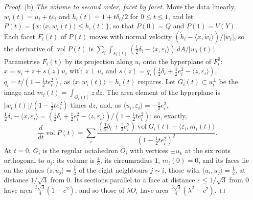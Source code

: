 \documentclass[11pt,reqno]{amsart}
\renewcommand{\_}{\origunderscore\allowbreak}
\numberwithin{equation}{section}
\theoremstyle{plain}
\theoremstyle{definition}
\theoremstyle{remark}
\DeclareMathOperator{\vol}{vol}
\begin{document}
\begin{proof}
(b) \emph{The volume to second order, facet by facet.} Move the data
linearly, $w_i(t)=u_i+t\varepsilon_i$ and $h_i(t)=1+t\delta_i/2$ for
$0\le t\le1$, and let $P(t)=\{x:\langle x,w_i(t)\rangle\le h_i(t)\}$, so that
$P(0)=Q$ and $P(1)=V(Y)$. Each facet $F_i(t)$ of $P(t)$ moves with normal
velocity $(\dot h_i-\langle x,\dot w_i\rangle)/|w_i|$, so the derivative of
$\vol P(t)$ is $\sum_i\int_{F_i(t)}(\frac12\delta_i-\langle x,\varepsilon_i\rangle)\,dA/|w_i(t)|$.
Parametrise $F_i(t)$ by its projection along $u_i$ onto the hyperplane of
$F_i^0$: $x=u_i+z+s(z)u_i$ with $z\perp u_i$ and
$s(z)=q_i(\frac12\delta_i+\frac12e_i^2-\langle z,\varepsilon_i\rangle)$,
$q_i=t/(1-\frac12te_i^2)$, as $\langle x,w_i(t)\rangle=h_i(t)$
requires. Let $G_i(t)\subset u_i^\perp$ be the image and
$m_i(t)=\int_{G_i(t)}z\,dz$. The area element of the hyperplane is
$|w_i(t)|/(1-\frac12te_i^2)$ times $dz$, and, as
$\langle u_i,\varepsilon_i\rangle=-\frac12e_i^2$,
$\frac12\delta_i-\langle x,\varepsilon_i\rangle=(\frac12\delta_i+\frac12e_i^2-\langle z,\varepsilon_i\rangle)/(1-\frac12te_i^2)$;
so, exactly,
\begin{equation}\label{eq:facet-derivative}
  \frac{d}{dt}\vol P(t)=\sum_i\frac{(\frac12\delta_i+\frac12e_i^2)\vol G_i(t)-\langle\varepsilon_i,m_i(t)\rangle}{(1-\frac12te_i^2)^2} .
\end{equation}
At $t=0$, $G_i$ is the regular octahedron $O_i$ with vertices $\pm u_k$ at
the six roots orthogonal to $u_i$: its volume is $\frac43$, its circumradius
$1$, $m_i(0)=0$, and its faces lie on the planes $\langle z,u_j\rangle=\frac12$
of the eight neighbours $j\sim i$, those with $\langle u_i,u_j\rangle=\frac12$,
at distance $1/\sqrt3$ from $0$. Its sections parallel to a face at distance
$c\le1/\sqrt3$ from $0$ have area $\frac{3\sqrt3}4(1-c^2)$, and so those of
$\lambda O_i$ have area $\frac{3\sqrt3}4(\lambda^2-c^2)$.


\end{proof}
\end{document}
